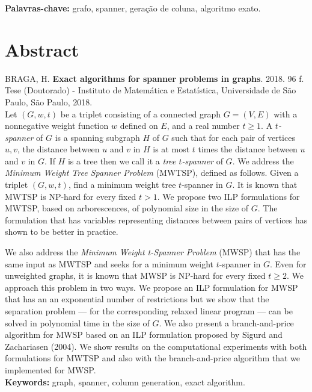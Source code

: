 \documentclass[12pt,twoside,a4paper]{book}
\begin{document}
\noindent \textbf{Palavras-chave:} grafo, spanner, geração de coluna, algoritmo exato.

\chapter*{Abstract}
\noindent BRAGA, H. \textbf{Exact algorithms for spanner problems in graphs}. 
2018. 96 f.
Tese (Doutorado) - Instituto de Matemática e Estatística,
Universidade de São Paulo, São Paulo, 2018.
\\


Let $(G,w,t)$ be a triplet consisting of a connected graph $G = (V,E)$ with
a nonnegative weight function $w$ defined on $E$, and a real number $t \ge 1$.
A \emph{$t$-spanner} of $G$ is a spanning subgraph $H$ of $G$ such that for each pair
of vertices $u,v$, the distance between $u$ and $v$ in $H$ is at most $t$ times
the distance between $u$ and $v$ in $G$. If $H$ is a tree then we call it a
\emph{tree $t$-spanner} of $G$.  We address the
\emph{Minimum Weight Tree Spanner Problem} (MWTSP), defined as follows.
Given a triplet $(G,w,t)$, find a
minimum weight tree $t$-spanner in $G$. It is known that MWTSP is NP-hard
for every fixed $t > 1$.  We propose two ILP formulations for MWTSP,
based on arborescences, of polynomial size in the size of $G$.  The formulation that has
variables representing distances between pairs of vertices has shown
to be better in practice. 

We also address the \emph{Minimum Weight t-Spanner Problem} (MWSP)
that has the same input as MWTSP and seeks for a minimum weight
$t$-spanner in $G$.  Even for unweighted graphs, it is known that MWSP
is NP-hard for every fixed $t \ge 2$. We approach this problem in two
ways. We propose an ILP formulation for MWSP that has an an
exponential number of restrictions but we show that the separation
problem --- for the corresponding relaxed linear program --- can be
solved in polynomial time in the size of $G$.  We also present a branch-and-price
algorithm for MWSP based on an ILP formulation proposed by Sigurd and
Zachariasen (2004).  We show results on the computational experiments
with both formulations for MWTSP and also with the branch-and-price
algorithm that we implemented for MWSP.
\\

\noindent \textbf{Keywords:} graph, spanner, column generation, exact algorithm.
\end{document}
